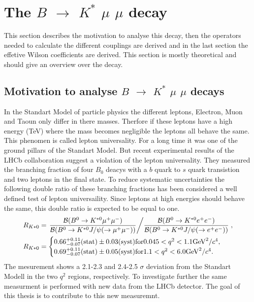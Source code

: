 \documentclass[english]{uzhpub}
\begin{document}
 \section{The $B$ $\rightarrow$ $K^{*}$ $\mu$ $\mu$ decay}

This section describes the motivation to analyse this decay, then the operators needed to calculate the different couplings are derived and in the last section the effetive Wilson coefficients are derived. This section is mostly theoretical and should give an overview over the decay.

 \subsection{Motivation to analyse $B$ $\rightarrow$ $K^{*}$ $\mu$ $\mu$ decays} \label{sec:Motivation}

 In the Standart Model of particle physics the different leptons, Electron, Muon and Taoun only differ in there masses. Therfore if these leptons have a high energy (TeV) where the mass becomes negligible the leptons all behave the same. This phenomen is called lepton universality. For a long time it was one of the ground pillars of the Standart Model. But recent experimental results of the LHCb collaboration \cite{bib:LU} suggest a violation of the lepton universality. They measured the branching fraction of four $B_0$ deacys with a $b$ quark to $s$ quark transistion and two leptons in the final state. To reduce systematic uncertainties the following double ratio of these branching fractions has been considered a well defined test of lepton universaility. Since leptons at high energies should behave the same, this double ratio is expected to be equal to one.
 \begin{equation}
   \begin{split}
   R_{K*0} &= \left. \dfrac{\mathcal{B}(B^0 \rightarrow K^{*0} \mu^+ \mu^-)}{\mathcal{B}(B^0 \rightarrow K^{*0} J/\psi(\rightarrow \mu^+ \mu^-))} \middle/   \dfrac{\mathcal{B}(B^0 \rightarrow K^{*0} e^+ e^-)}{\mathcal{B} ( B^0 \rightarrow K^{*0} J/\psi(\rightarrow e^+ e^-))}  \right. , \\
   R_{K*0} &=   \begin{cases}
     0.66^{+0.11}_{-0.07} (\text{stat}) \pm 0.03 (\text{syst}) \text{for} 0.045 < q^2 < 1.1 \text{GeV}^2/c^4, \\
     0.69^{+0.11}_{-0.07} (\text{stat}) \pm 0.05 (\text{syst}) \text{for} 1.1 < q^2 < 6.0 \text{GeV}^2/c^4.
 \end{cases}
 \end{split}
 \end{equation}
 The mesurement shows a 2.1-2.3 and 2.4-2.5 $\sigma$ deviation from the Standart Modell in the two $q^2$ regions, respectively.
 To investigate further the same measurment is performed with new data from the LHCb detector. The goal of this thesis is to contribute to this new measuremnt.
\end{document}

